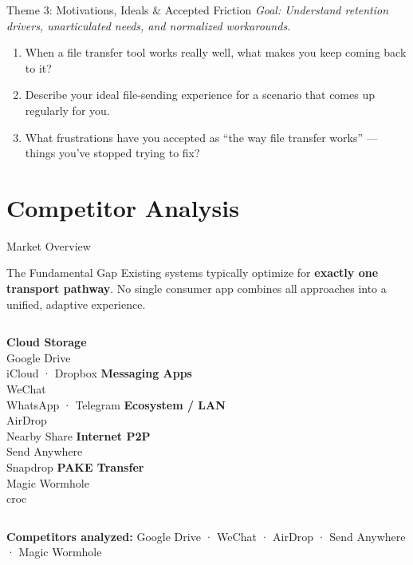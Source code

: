 \documentclass[xcolor=table,dvipsnames,svgnames,aspectratio=169]{beamer}
\begin{document}
\begin{frame}{Theme 3: Motivations, Ideals \& Accepted Friction}
  \textit{Goal: Understand retention drivers, unarticulated needs, and normalized workarounds.}

  \vspace{0.8em}

  \begin{enumerate}
    \item[\textbf{Q10}] When a file transfer tool works really well, what makes you keep coming back to it?
    \item[\textbf{Q11}] Describe your ideal file-sending experience for a scenario that comes up regularly for you.
    \item[\textbf{Q12}] What frustrations have you accepted as ``the way file transfer works'' --- things you've stopped trying to fix?
  \end{enumerate}
\end{frame}

\section{Competitor Analysis}

\begin{frame}{Market Overview}
  \begin{block}{The Fundamental Gap}
    Existing systems typically optimize for \textbf{exactly one transport pathway}. No single consumer app combines all approaches into a unified, adaptive experience.
  \end{block}

  \vspace{0.5em}

  \begin{columns}[c]
    \centering\small\textbf{Cloud Storage}\\[0.3em]
    \footnotesize Google Drive\\iCloud · Dropbox
    \centering\small\textbf{Messaging Apps}\\[0.3em]
    \footnotesize WeChat\\WhatsApp · Telegram
    \centering\small\textbf{Ecosystem / LAN}\\[0.3em]
    \footnotesize AirDrop\\Nearby Share
    \centering\small\textbf{Internet P2P}\\[0.3em]
    \footnotesize Send Anywhere\\Snapdrop
    \centering\small\textbf{PAKE Transfer}\\[0.3em]
    \footnotesize Magic Wormhole\\croc
  \end{columns}

  \vspace{0.8em}
  \centering\textbf{Competitors analyzed:} Google Drive · WeChat · AirDrop · Send Anywhere · Magic Wormhole
\end{frame}
\end{document}
